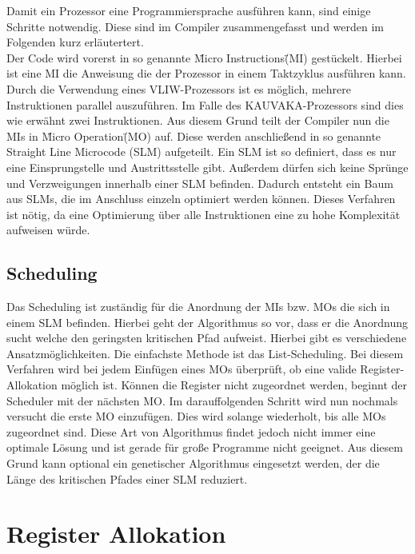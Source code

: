 Damit ein Prozessor eine Programmiersprache ausführen kann, sind einige Schritte notwendig. Diese sind im Compiler zusammengefasst und werden im Folgenden kurz erläutertert.\\
Der Code wird vorerst in so genannte \"Micro Instructions\" (MI) gestückelt.  Hierbei ist eine MI die Anweisung die der Prozessor in einem Taktzyklus ausführen kann. Durch die Verwendung eines VLIW-Prozessors ist es möglich, mehrere Instruktionen parallel auszuführen. Im Falle des KAUVAKA-Prozessors sind dies wie erwähnt zwei Instruktionen. Aus diesem Grund teilt der Compiler nun die MIs in \"Micro Operation\" (MO) auf. Diese werden anschließend in so genannte \glqq Straight Line Microcode\grqq{} (SLM) aufgeteilt. Ein SLM ist so definiert, dass es nur eine Einsprungstelle und Austrittsstelle gibt. Außerdem dürfen sich keine Sprünge und Verzweigungen innerhalb einer SLM befinden.  Dadurch entsteht ein Baum aus SLMs, die im Anschluss einzeln optimiert werden können. Dieses Verfahren ist nötig, da eine Optimierung über alle Instruktionen eine zu hohe Komplexität aufweisen würde. \cite{landskov1980local}
\subsection{Scheduling}
\label{sec:scheduling}
Das Scheduling ist zuständig für die Anordnung der MIs bzw. MOs die sich in einem SLM befinden. Hierbei geht der Algorithmus so vor, dass er die Anordnung sucht welche den geringsten kritischen Pfad aufweist. Hierbei gibt es verschiedene Ansatzmöglichkeiten. Die einfachste Methode ist das List-Scheduling. Bei diesem Verfahren wird bei jedem Einfügen eines MOs überprüft, ob eine valide Register-Allokation möglich ist. Können die Register nicht zugeordnet werden, beginnt der Scheduler mit der nächsten MO. Im darauffolgenden Schritt wird nun nochmals versucht die erste MO einzufügen. Dies wird solange wiederholt, bis alle MOs zugeordnet sind.\cite{landskov1980local}
Diese Art von Algorithmus findet jedoch nicht immer eine optimale Lösung und ist gerade für große Programme nicht geeignet. Aus diesem Grund kann optional ein genetischer Algorithmus eingesetzt werden, der die Länge des kritischen Pfades einer SLM reduziert.


\section{Register Allokation}
\label{sec:register allok}
